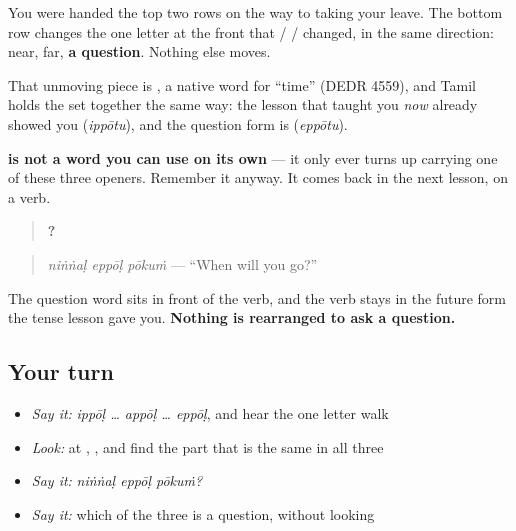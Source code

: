 You were handed the top two rows on the way to taking your leave. The bottom row changes the one letter at the front that  /  /  changed, in the same direction: near, far, \textbf{a question}. Nothing else moves.

\begin{cousinweb}
That unmoving piece is \textbf{}, a native word for \textquotedblleft{}time\textquotedblright{} (DEDR 4559), and Tamil holds the set together the same way: the lesson that taught you \emph{now} already showed you \textbf{} (\emph{ippōtu}), and the question form is \textbf{} (\emph{eppōtu}).

\textbf{ is not a word you can use on its own} — it only ever turns up carrying one of these three openers. Remember it anyway. It comes back in the next lesson, on a verb.
\end{cousinweb}

\begin{grammarlens}[title={Grammar Lens: asking rearranges nothing}]
\begin{quote}
\textbf{  ?}
\end{quote}

\begin{quote}
\emph{niṅṅaḷ eppōḷ pōkuṁ} — \textquotedblleft{}When will you go?\textquotedblright{}
\end{quote}

The question word sits in front of the verb, and the verb stays in the future form the tense lesson gave you. \textbf{Nothing is rearranged to ask a question.}
\end{grammarlens}

\subsection*{Your turn}
\begin{itemize}
\raggedright
  \item \emph{Say it:} \emph{ippōḷ … appōḷ … eppōḷ}, and hear the one letter walk
  \item \emph{Look:} at \textbf{}, \textbf{}, \textbf{} and find the part that is the same in all three
  \item \emph{Say it:} \emph{niṅṅaḷ eppōḷ pōkuṁ?}
  \item \emph{Say it:} which of the three is a question, without looking
\end{itemize}

